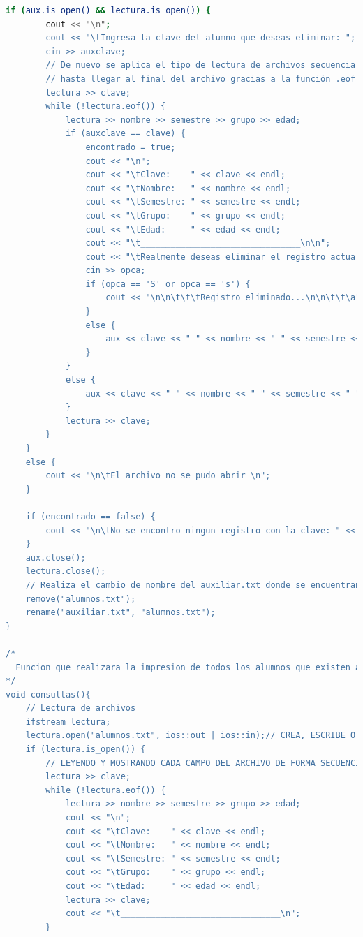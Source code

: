 \documentclass[12pt]{article}
\begin{document}
\begin{lstlisting}[language=bash,frame=single,style=CStyle]
    if (aux.is_open() && lectura.is_open()) {
        cout << "\n";
        cout << "\tIngresa la clave del alumno que deseas eliminar: ";
        cin >> auxclave;
        // De nuevo se aplica el tipo de lectura de archivos secuencial, esto quiere decir que lee campo por campo hasta
        // hasta llegar al final del archivo gracias a la función .eof()
        lectura >> clave;
        while (!lectura.eof()) {
            lectura >> nombre >> semestre >> grupo >> edad;
            if (auxclave == clave) {
                encontrado = true;
                cout << "\n";
                cout << "\tClave:    " << clave << endl;
                cout << "\tNombre:   " << nombre << endl;
                cout << "\tSemestre: " << semestre << endl;
                cout << "\tGrupo:    " << grupo << endl;
                cout << "\tEdad:     " << edad << endl;
                cout << "\t________________________________\n\n";
                cout << "\tRealmente deseas eliminar el registro actual (S/N)? ---> ";
                cin >> opca;
                if (opca == 'S' or opca == 's') {
                    cout << "\n\n\t\t\tRegistro eliminado...\n\n\t\t\a";
                }
                else {
                    aux << clave << " " << nombre << " " << semestre << " " << grupo << " " << edad << endl;
                }
            }
            else {
                aux << clave << " " << nombre << " " << semestre << " " << grupo << " " << edad << endl;
            }
            lectura >> clave;
        }
    }
    else {
        cout << "\n\tEl archivo no se pudo abrir \n";
    }

    if (encontrado == false) {
        cout << "\n\tNo se encontro ningun registro con la clave: " << auxclave << "\n\n\t\t\t";
    }
    aux.close();
    lectura.close();
    // Realiza el cambio de nombre del auxiliar.txt donde se encuentran los alumnos que no han sido eliminados
    remove("alumnos.txt");
    rename("auxiliar.txt", "alumnos.txt");
}

/*
  Funcion que realizara la impresion de todos los alumnos que existen actualmente
*/
void consultas(){
    // Lectura de archivos
    ifstream lectura;
    lectura.open("alumnos.txt", ios::out | ios::in);// CREA, ESCRIBE O LEE
    if (lectura.is_open()) {
        // LEYENDO Y MOSTRANDO CADA CAMPO DEL ARCHIVO DE FORMA SECUENCIAL
        lectura >> clave;
        while (!lectura.eof()) {
            lectura >> nombre >> semestre >> grupo >> edad;
            cout << "\n";
            cout << "\tClave:    " << clave << endl;
            cout << "\tNombre:   " << nombre << endl;
            cout << "\tSemestre: " << semestre << endl;
            cout << "\tGrupo:    " << grupo << endl;
            cout << "\tEdad:     " << edad << endl;
            lectura >> clave;
            cout << "\t________________________________\n";
        }


\end{lstlisting}
\end{document}
